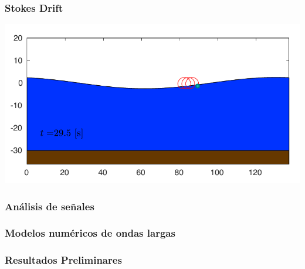 \documentclass[11pt,letterpaper]{article}
\begin{document}
\begin{tcolorbox}[breakable]
\subsubsection*{Stokes Drift}

\lipsum[26]

{\centering
\includegraphics[scale=0.9]{figs/fig_2.pdf}
\vspace{-3.5mm}
}
\vspace{3.5mm}



\subsubsection*{Análisis de señales}

\lipsum[27]

\subsubsection*{Modelos numéricos de ondas largas}

\lipsum[28]


\subsubsection{Resultados Preliminares} \label{sec:sec4}


\end{tcolorbox}
\end{document}
